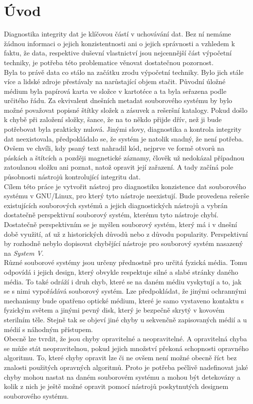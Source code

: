 \chapter*{Úvod}
{}

Diagnostika integrity dat je klíčovou částí v uchovávání dat. Bez ní nemáme žádnou informaci o jejich konzistentnosti ani o jejich správnosti a vzhledem k faktu, že data, respektive duševní vlastnictví jsou nejcennější část výpočetní techniky, je potřeba této problematice věnovat dostatečnou pozornost.\\
Byla to právě data co stálo na začátku zrodu výpočetní techniky. Bylo jich stále více a lidské zdroje přestávaly na narůstající objem stačit. Původní úložné médium byla papírová karta ve složce v kartotéce a ta byla seřazena podle určitého řádu. Za ekvivalent dnešních metadat souborového systému by bylo možné považovat popisné štítky složek a zásuvek a rešeršní katalogy. Pokud došlo k chybě při založení složky, šance, že na to někdo přijde dřív, než ji bude potřebovat byla prakticky nulová. Jinými slovy, diagnostika a kontrola integrity dat neexistovala, předpokládalo se, že systém je natolik snadný, že není potřeba. Ovšem ve chvíli, kdy psaný text nahradil kód, nejprve ve formě otvorů na páskách a štítcích a později magnetické záznamy, člověk už nedokázal případnou zatoulanou složku ani poznat, natož opravit její zařazení. A tady začíná pole působnosti nástrojů kontrolující integritu dat.\\ 
Cílem této práce je vytvořit nástroj pro diagnostiku konzistence dat souborového systému v GNU/Linux, pro který tyto nástroje neexistují. Bude provedena rešerše existujících souborových systémů a jejich diagnostických nástrojů a vybrán dostatečně perspektivní souborový systém, kterému tyto nástroje chybí. Dostatečně perspektivním se je myšlen souborový systém, který má i v dnešní době využití, ať už z historických důvodů nebo z důvodu popularity. Perspektivní by rozhodně nebylo dopisovat chybějící nástroje pro souborový systém nasazený na \emph{System V}.\\
Různé souborové systémy jsou určeny přednostně pro určitá fyzická média. Tomu odpovídá i jejich design, který obvykle respektuje silné a slabé stránky daného média. To také odráží i druh chyb, které se na daném médiu vyskytují a to, jak se s nimi vypořádává souborový systém. Lze předpokládat, že jinými ochrannými mechanismy bude opatřeno optické médium, které je samo vystaveno kontaktu s fyzickým světem a jinými pevný disk, který je bezpečně skrytý v kovovém sterilním těle. Stejně tak se objeví jiné chyby u sekvenčně zapisovaných médií a u médií s náhodným přístupem.\\
Obecně lze tvrdit, že jsou chyby opravitelné a neopravitelné. A opravitelná chyba se může stát neopravitelnou, pokud jejich množství překoná schopnosti opravného algoritmu. To, které chyby opravit lze či ne ovšem není možné obecně říct bez znalosti použitých opravných algoritmů. Proto je potřeba pečlivě nadefinovat jaké chyby mohou nastat na daném souborovém systému a mohou být detekovány a kolik z nich je ještě možné opravit pomocí nástrojů poskytnutých designem souborového systému. 
